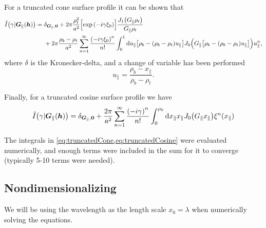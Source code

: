 For a truncated cone surface profile it can be shown that \cite{maradudin2018features}
\begin{align}
    \hat I\del[1]{\gamma\vert \vec G_\|(\vec h)} = {}
    &\delta_{\vec G_\|, \vec 0} + 2\pi \frac{\rho_t^2}{a^2} \sbr[2]{\exp\del{-i\gamma\xi_0}}\frac{J_1\del[1]{G_\| \rho_t}}{G_\| \rho_t} \\
    & + 2\pi\frac{\rho_b - \rho_t}{a^2} \sum_{n=1}^{\infty} \frac{\del{-i\gamma\xi_0}^n}{n!}
    \int_0^1 \dif u_\| \sbr[1]{\rho_b - \del[0]{\rho_b - \rho_t}u_\|} J_0 \del[2]{G_\| \sbr[1]{\rho_b - \del[0]{\rho_b - \rho_t}u_\|}} u_\|^n,
    \label{eq:truncatedCone}
\end{align}
where $\delta$ is the Kronecker-delta, and a change of variable has been performed
\begin{equation}
    u_\| = \frac{\rho_b - x_\|}{\rho_b - \rho_t}.
\end{equation}

Finally, for a truncated cosine surface profile we have \cite{maradudin2018features}
\begin{align}
    \hat I\del[1]{\gamma\vert \vec G_\|(\vec h)} = 
    \delta_{\vec G_\|, \vec 0} + 
    \frac{2\pi}{a^2} \sum_{n=1}^{\infty} \frac{\del{-i\gamma}^n}{n!}
    \int_0^{\rho_0} \dif x_\| x_\| J_0 \del[1]{G_\| x_\|}\xi^n\del[0]{x_\|}
    \label{eq:truncatedCosine}
\end{align}

The integrals in \cref{eq:truncatedCone,eq:truncatedCosine} were evaluated numerically, and enough terms were included in the sum for it to converge (typically 5-10 terms were needed).

\subsection*{Nondimensionalizing}
We will be using the wavelength as the length scale $x_0 = \lambda$ when numerically solving the equations.